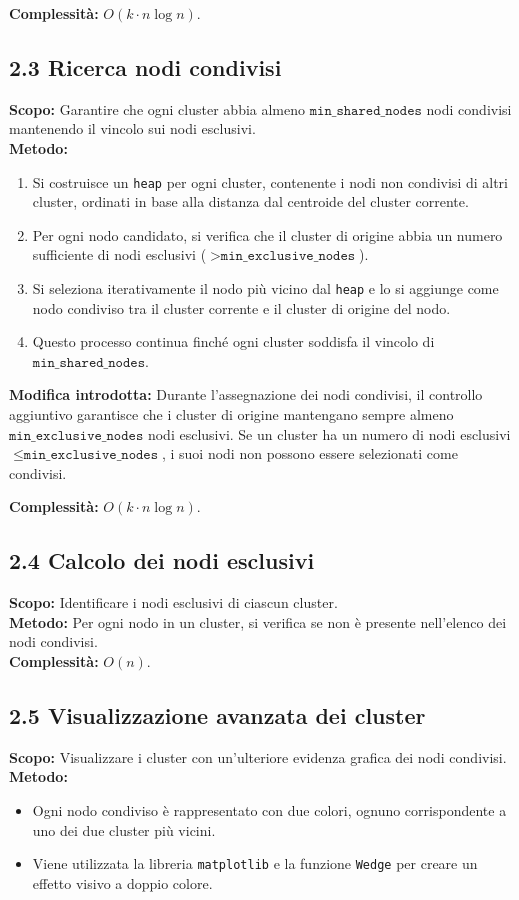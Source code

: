 \documentclass[a4paper,12pt]{article}
\begin{document}
\textbf{Complessità:} \( O(k \cdot n \log n) \).

\subsection*{2.3 Ricerca nodi condivisi}
\textbf{Scopo:} Garantire che ogni cluster abbia almeno \( \texttt{min\_shared\_nodes} \) nodi condivisi mantenendo il vincolo sui nodi esclusivi.\\
\textbf{Metodo:}
\begin{enumerate}
    \item Si costruisce un \texttt{heap} per ogni cluster, contenente i nodi non condivisi di altri cluster, ordinati in base alla distanza dal centroide del cluster corrente.
    \item Per ogni nodo candidato, si verifica che il cluster di origine abbia un numero sufficiente di nodi esclusivi (\( > \texttt{min\_exclusive\_nodes} \)).
    \item Si seleziona iterativamente il nodo più vicino dal \texttt{heap} e lo si aggiunge come nodo condiviso tra il cluster corrente e il cluster di origine del nodo.
    \item Questo processo continua finché ogni cluster soddisfa il vincolo di \( \texttt{min\_shared\_nodes} \).
\end{enumerate}

\textbf{Modifica introdotta:} Durante l'assegnazione dei nodi condivisi, il controllo aggiuntivo garantisce che i cluster di origine mantengano sempre almeno \( \texttt{min\_exclusive\_nodes} \) nodi esclusivi. Se un cluster ha un numero di nodi esclusivi \( \leq \texttt{min\_exclusive\_nodes} \), i suoi nodi non possono essere selezionati come condivisi.

\textbf{Complessità:} \( O(k \cdot n \log n) \).

\subsection*{2.4 Calcolo dei nodi esclusivi}
\textbf{Scopo:} Identificare i nodi esclusivi di ciascun cluster.\\
\textbf{Metodo:} Per ogni nodo in un cluster, si verifica se non è presente nell'elenco dei nodi condivisi.\\
\textbf{Complessità:} \( O(n) \).

\subsection*{2.5 Visualizzazione avanzata dei cluster}
\textbf{Scopo:} Visualizzare i cluster con un'ulteriore evidenza grafica dei nodi condivisi.\\
\textbf{Metodo:}
\begin{itemize}
    \item Ogni nodo condiviso è rappresentato con due colori, ognuno corrispondente a uno dei due cluster più vicini.
    \item Viene utilizzata la libreria \texttt{matplotlib} e la funzione \texttt{Wedge} per creare un effetto visivo a doppio colore.
\end{itemize}
\end{document}
